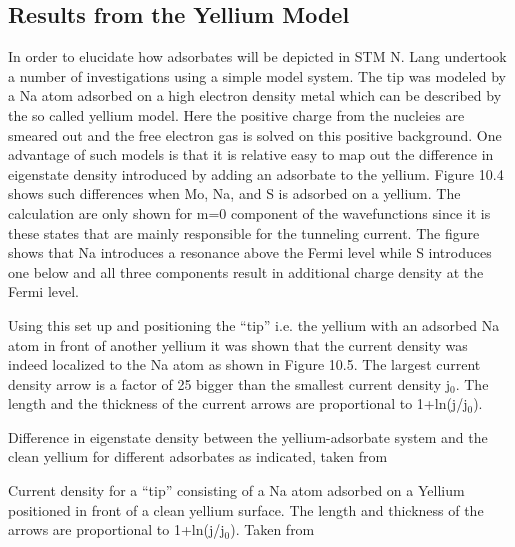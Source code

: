 \subsection{Results from the Yellium Model}
In order to elucidate how adsorbates will be depicted in STM N. Lang \cite{Lang} undertook a number of investigations using  a simple model system. The tip was modeled by a Na atom adsorbed on a high electron density metal which can be described by the so called yellium model. Here the positive charge from the nucleies are smeared out and the free electron gas is solved on this positive background. One advantage of such models is that it is relative easy to map out the difference in eigenstate density introduced by adding an adsorbate to the yellium. Figure 10.4 shows such differences when Mo, Na, and S is adsorbed on a yellium. The calculation are only shown for m=0 component of the wavefunctions since it is these states that are mainly  responsible for  the tunneling current. The figure shows that Na introduces a resonance above the Fermi level while S introduces one below and all three components result in additional charge density at the Fermi level. 


Using this set up  and positioning the ``tip'' i.e. the yellium with an adsorbed  Na atom in front of another yellium it was shown that the current density was indeed localized to the Na atom as shown in Figure 10.5. The largest current density arrow is a factor of 25 bigger than the smallest current density j$_0$. The length and the thickness of the current arrows are proportional to 1+ln(j/j$_0$).
 
\vspace*{8cm}

 Difference in eigenstate density between the yellium-adsorbate system and the clean yellium for different adsorbates as indicated, taken from \cite{Lang}

\vspace{1cm}  




\vspace*{8cm}

  Current density for a ``tip'' consisting of a Na atom adsorbed on a Yellium positioned in front of a clean yellium surface. The length and thickness of the arrows are proportional to 1+ln(j/j$_0$). Taken from \cite{Lang} 

\vspace{1cm}




